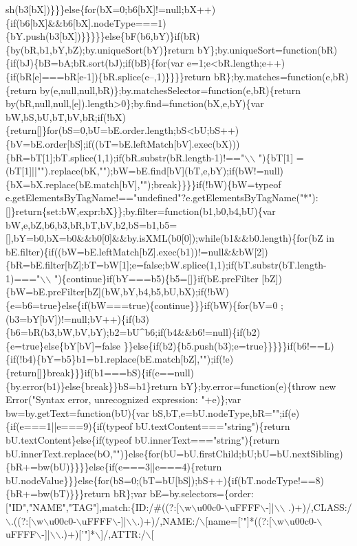 \begin{DoxyCode}
{      sh(b3[bX])\}\}\}else\{for(bX=0;b6[bX]!=null;bX++)\{if(b6[bX]&&b6[bX].nodeType===1)\{bY.push(b3[bX])\}\}\}\}\}else\{bF(b6,bY)\}if(bR)\{by(bR,b1,bY,bZ);by.uniqueSort(bY)\}return
       bY\};by.uniqueSort=function(bR)\{if(bJ)\{bB=bA;bR.sort(bJ);if(bB)\{for(var e=1;e<bR.length;e++)\{if(bR[e]===bR[e-1])\{bR.splice(e--,1)\}\}\}\}return
       bR\};by.matches=function(e,bR)\{return by(e,null,null,bR)\};by.matchesSelector=function(e,bR)\{return
       by(bR,null,null,[e]).length>0\};by.find=function(bX,e,bY)\{var
       bW,bS,bU,bT,bV,bR;if(!bX)\{return[]\}for(bS=0,bU=bE.order.length;bS<bU;bS++)\{bV=bE.order[bS];if((bT=bE.leftMatch[bV].exec(bX)))\{bR=bT[1];bT.splice(1,1);if(bR.substr(bR.length-1)!=="\(\backslash\)\(\backslash\)
      ")\{bT[1]
      =(bT[1]||"").replace(bK,"");bW=bE.find[bV](bT,e,bY);if(bW!=null)\{bX=bX.replace(bE.match[bV],"");break\}\}\}\}if(!bW)\{bW=typeof
       e.getElementsByTagName!=="undefined"?e.getElementsByTagName("*"):[]\}return\{set:bW,expr:bX\}\};by.filter=function(b1,b0,b4,bU)\{var
       bW,e,bZ,b6,b3,bR,bT,bV,b2,bS=b1,b5=[],bY=b0,bX=b0&&b0[0]&&by.isXML(b0[0]);while(b1&&b0.length)\{for(bZ in
       bE.filter)\{if((bW=bE.leftMatch[bZ].exec(b1))!=null&&bW[2])\{bR=bE.filter[bZ];bT=bW[1];e=false;bW.splice(1,1);if(bT.substr(bT.length-1)==="\(\backslash\)\(\backslash\)
      ")\{continue\}if(bY===b5)\{b5=[]\}if(bE.preFilter
      [bZ])\{bW=bE.preFilter[bZ](bW,bY,b4,b5,bU,bX);if(!bW)\{e=b6=true\}else\{if(bW===true)\{continue\}\}\}if(bW)\{for(bV=0
      ;(b3=bY[bV])!=null;bV++)\{if(b3)\{b6=bR(b3,bW,bV,bY);b2=bU^b6;if(b4&&b6!=null)\{if(b2)\{e=true\}else\{bY[bV]=false
      \}\}else\{if(b2)\{b5.push(b3);e=true\}\}\}\}\}if(b6!==L)\{if(!b4)\{bY=b5\}b1=b1.replace(bE.match[bZ],"");if(!e)\{return[]\}break\}\}\}if(b1===bS)\{if(e==null)\{by.error(b1)\}else\{break\}\}bS=b1\}return bY\};by.error=function(e)\{throw new
       Error("Syntax error, unrecognized expression: "+e)\};var bw=by.getText=function(bU)\{var
       bS,bT,e=bU.nodeType,bR="";if(e)\{if(e===1||e===9)\{if(typeof bU.textContent==="string")\{return bU.textContent\}else\{if(typeof
       bU.innerText==="string")\{return
       bU.innerText.replace(bO,"")\}else\{for(bU=bU.firstChild;bU;bU=bU.nextSibling)\{bR+=bw(bU)\}\}\}\}else\{if(e===3||e===4)\{return
       bU.nodeValue\}\}\}else\{for(bS=0;(bT=bU[bS]);bS++)\{if(bT.nodeType!==8)\{bR+=bw(bT)\}\}\}return bR\};var bE=by.selectors=\{order:["ID","NAME","TAG"],match:\{ID:/#((?:[\(\backslash\)w\(\backslash\)u00c0-\(\backslash\)uFFFF\(\backslash\)-]|\(\backslash\)\(\backslash\)
      .)+)/,CLASS:/\(\backslash\).((?:[\(\backslash\)w\(\backslash\)u00c0-\(\backslash\)uFFFF\(\backslash\)-]|\(\backslash\)\(\backslash\).)+)/,NAME:/\(\backslash\)[name=['}\textcolor{stringliteral}{"]*((?:[\(\backslash\)w\(\backslash\)u00c0-\(\backslash\)uFFFF\(\backslash\)-]|\(\backslash\)\(\backslash\).)+)['"}]*\(\backslash\)]/,ATTR:/\(\backslash\)[

\end{DoxyCode}
